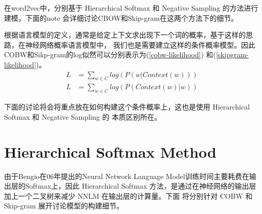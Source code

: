 \documentclass[UTF8]{ctexart}
\begin{document}
\par
在word2vec中，分别基于 Hierarchical Softmax 和 Negative Sampling 的方法进行建模，下面的note
会详细讨论CBOW和Skip-gram在这两个方法下的细节。
\par
根据语言模型的定义，通常是给定上下文求出现下一个词的概率，基于这样的思路，在神经网络概率语言模型中，
我们也是需要建立这样的条件概率模型。因此COBW和Sikp-gram的log似然可以分别表示为(\ref{cobw-likelihood})
和(\ref{skipgram-likelihood})。
\begin{align}
\label{cobw-likelihood}
L &= \sum_{w \in C} log(P(w|Context(w)))
\\
\label{skipgram-likelihood}
L &= \sum_{w \in C} log(P(Context(w) | w)) 
\end{align}

\par
下面的讨论将会将重点放在如何构建这个条件概率上，这也是使用 Hierarchical Softmax 和 Negative Sampling 的
本质区别所在。

\section{Hierarchical Softmax Method}
由于Bengio在06年提出的Neural Network Language Model训练时间主要耗费在输出层的Softmax上，因此
Hierarchical Softmax 方法，是通过在神经网络的输出层加上一个二叉树来减少 NNLM 在输出层的计算量。下面
将分别针对 COBW 和 Skip-gram 展开讨论模型的构建细节。
\end{document}
